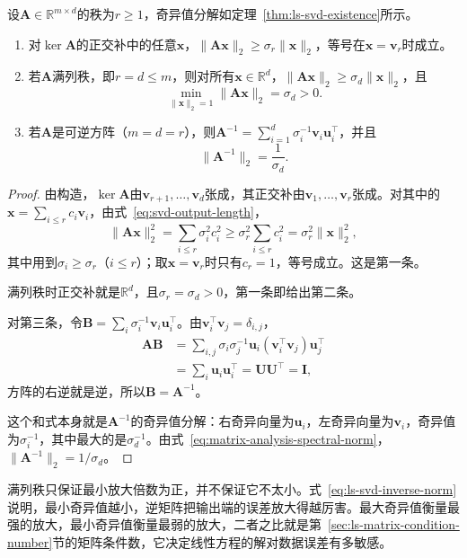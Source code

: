 \begin{theorem}[最小奇异值与逆矩阵的范数]
\label{thm:ls-svd-singular-value-norms}
设$\bm A\in\mathbb R^{m\times d}$的秩为$r\geq1$，奇异值分解如定理~\ref{thm:ls-svd-existence}所示。
\begin{enumerate}
 \item 对$\ker\bm A$的正交补中的任意$\bm x$，$\lVert\bm A\bm x\rVert_2\geq\sigma_r\lVert\bm x\rVert_2$，等号在$\bm x=\bm v_r$时成立。
 \item 若$\bm A$满列秩，即$r=d\leq m$，则对所有$\bm x\in\mathbb R^d$，$\lVert\bm A\bm x\rVert_2\geq\sigma_d\lVert\bm x\rVert_2$，且
 \[
  \min_{\lVert\bm x\rVert_2=1}\lVert\bm A\bm x\rVert_2=\sigma_d>0 .
 \]
 \item 若$\bm A$是可逆方阵（$m=d=r$），则$\bm A^{-1}=\sum_{i=1}^d\sigma_i^{-1}\bm v_i\bm u_i^\top$，并且
 \begin{equation}
  \lVert\bm A^{-1}\rVert_2=\frac1{\sigma_d}.
  \label{eq:ls-svd-inverse-norm}
 \end{equation}
\end{enumerate}
\end{theorem}
\begin{proof}
由构造，$\ker\bm A$由$\bm v_{r+1},\ldots,\bm v_d$张成，其正交补由$\bm v_1,\ldots,\bm v_r$张成。对其中的$\bm x=\sum_{i\leq r}c_i\bm v_i$，由式~\eqref{eq:svd-output-length}，
\[
 \lVert\bm A\bm x\rVert_2^2=\sum_{i\leq r}\sigma_i^2c_i^2\geq\sigma_r^2\sum_{i\leq r}c_i^2=\sigma_r^2\lVert\bm x\rVert_2^2 ,
\]
其中用到$\sigma_i\geq\sigma_r$（$i\leq r$）；取$\bm x=\bm v_r$时只有$c_r=1$，等号成立。这是第一条。

满列秩时正交补就是$\mathbb R^d$，且$\sigma_r=\sigma_d>0$，第一条即给出第二条。

对第三条，令$\bm B=\sum_i\sigma_i^{-1}\bm v_i\bm u_i^\top$。由$\bm v_i^\top\bm v_j=\delta_{i,j}$，
\[
 \begin{aligned}
 \bm A\bm B&=\sum_{i,j}\sigma_i\sigma_j^{-1}\bm u_i(\bm v_i^\top\bm v_j)\bm u_j^\top\\
 &=\sum_i\bm u_i\bm u_i^\top=\bm U\bm U^\top=\bm I,
 \end{aligned}
\]
方阵的右逆就是逆，所以$\bm B=\bm A^{-1}$。

这个和式本身就是$\bm A^{-1}$的奇异值分解：右奇异向量为$\bm u_i$，左奇异向量为$\bm v_i$，奇异值为$\sigma_i^{-1}$，其中最大的是$\sigma_d^{-1}$。由式~\eqref{eq:matrix-analysis-spectral-norm}，$\lVert\bm A^{-1}\rVert_2=1/\sigma_d$。
\end{proof}

满列秩只保证最小放大倍数为正，并不保证它不太小。式~\eqref{eq:ls-svd-inverse-norm}说明，最小奇异值越小，逆矩阵把输出端的误差放大得越厉害。最大奇异值衡量最强的放大，最小奇异值衡量最弱的放大，二者之比就是第~\ref{sec:ls-matrix-condition-number}节的矩阵条件数，它决定线性方程的解对数据误差有多敏感。

